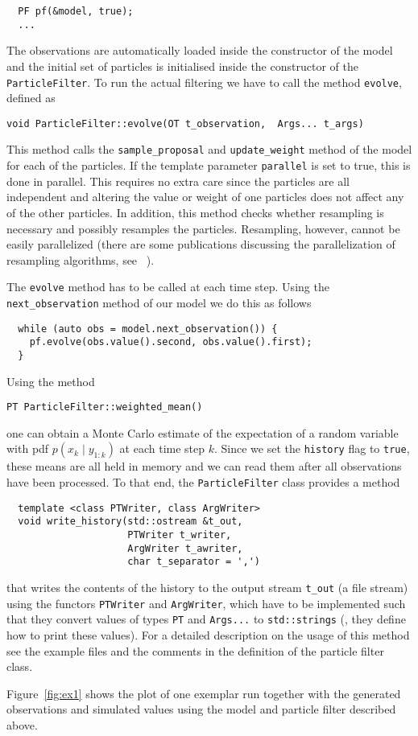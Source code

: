 \begin{example}
\begin{verbatim}
  PF pf(&model, true);
  ...
\end{verbatim}
  The observations are automatically loaded inside the constructor of
  the model and the initial set of particles is initialised inside the
  constructor of the \texttt{ParticleFilter}. To run the actual
  filtering we have to call the method \texttt{evolve}, defined as
\begin{verbatim}
void ParticleFilter::evolve(OT t_observation,  Args... t_args)
\end{verbatim}
  This method calls the \texttt{sample\_proposal} and
  \texttt{update\_weight} method of the model for each of the
  particles. If the template parameter \texttt{parallel} is set to
  true, this is done in parallel. This requires no extra care since
  the particles are all independent and altering the value or weight
  of one particles does not affect any of the other particles.  In
  addition, this method checks whether resampling is necessary and
  possibly resamples the particles. Resampling, however, cannot be
  easily parallelized (there are some publications discussing the
  parallelization of resampling algorithms, see \eg~\cite{murray}).

  The \texttt{evolve} method has to be called at each time step. Using
  the \texttt{next\_observation} method of our model we do this as
  follows
\begin{verbatim}
  while (auto obs = model.next_observation()) {
    pf.evolve(obs.value().second, obs.value().first);
  }
\end{verbatim}
  Using the method
\begin{verbatim}
PT ParticleFilter::weighted_mean()
\end{verbatim}
  one can obtain a Monte Carlo estimate of the expectation of a random
  variable with pdf $p(x_k \mid y_{1:k})$ at each time step $k$. Since
  we set the \texttt{history} flag to \texttt{true}, these means are
  all held in memory and we can read them after all observations have
  been processed. To that end, the \texttt{ParticleFilter} class
  provides a method
\begin{verbatim}
  template <class PTWriter, class ArgWriter>
  void write_history(std::ostream &t_out, 
                     PTWriter t_writer,
                     ArgWriter t_awriter, 
                     char t_separator = ',')
\end{verbatim}
  that writes the contents of the history to the output stream
  \texttt{t\_out} (\eg a file stream) using the functors
  \texttt{PTWriter} and \texttt{ArgWriter}, which have to be
  implemented such that they convert values of types \texttt{PT} and
  \texttt{Args...} to \texttt{std::strings} (\ie, they define how to
  print these values). For a detailed description on the usage of this
  method see the example files and the comments in the definition of
  the particle filter class.

  Figure~\ref{fig:ex1} shows the plot of one exemplar run together
  with the generated observations and simulated values using the model
  and particle filter described above.
  
\end{example}

